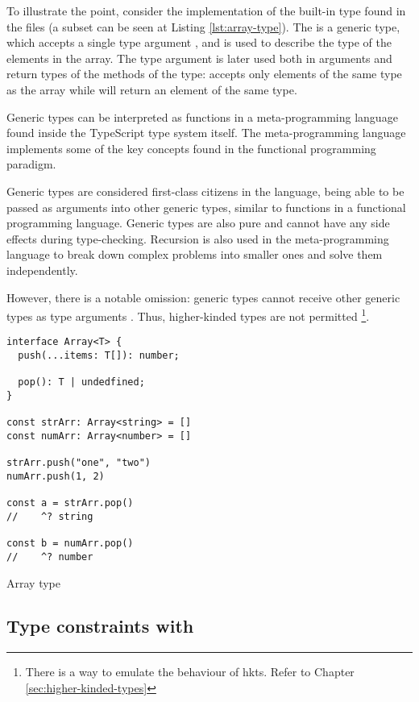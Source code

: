 To illustrate the point, consider the implementation of the built-in  type found in the  files (a subset can be seen at Listing \ref{lst:array-type}). The  is a generic type, which accepts a single type argument , and is used to describe the type of the elements in the array. The type argument  is later used both in arguments and return types of the methods of the  type:  accepts only elements of the same type as the array while  will return an element of the same type.

Generic types can be interpreted as functions in a meta-programming language found inside the TypeScript type system itself. The meta-programming language implements some of the key concepts found in the functional programming paradigm.

Generic types are considered first-class citizens in the language, being able to be passed as arguments into other generic types, similar to functions in a functional programming language. Generic types are also pure and cannot have any side effects during type-checking. Recursion is also used in the meta-programming language to break down complex problems into smaller ones and solve them independently.

However, there is a notable omission: generic types cannot receive other generic types as type arguments \cite{TypeInferenceHigherorder}. Thus, higher-kinded types are not permitted \footnote{There is a way to emulate the behaviour of \acrshort{hkt}s. Refer to Chapter \ref{sec:higher-kinded-types}}.

\clearpage

\begin{listing}[ht]
  \begin{verbatim}
interface Array<T> {
  push(...items: T[]): number;

  pop(): T | undedfined;
}

const strArr: Array<string> = []
const numArr: Array<number> = []

strArr.push("one", "two")
numArr.push(1, 2)

const a = strArr.pop()
//    ^? string

const b = numArr.pop()
//    ^? number
\end{verbatim}
  \caption{Array type}\label{lst:array-type}
\end{listing}

\subsection{Type constraints with }

